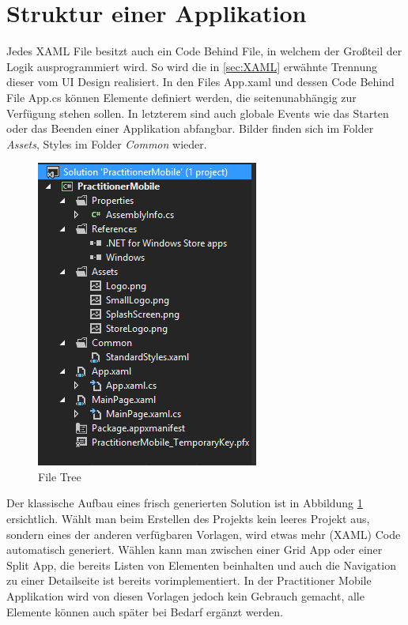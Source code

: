 \documentclass[a4paper,bibtotoc,oneside]{scrbook}
\begin{document}
\section{Struktur einer Applikation}
Jedes XAML File besitzt auch ein Code Behind File, in welchem der Großteil der Logik ausprogrammiert wird. So wird die in \ref{sec:XAML} erwähnte Trennung dieser vom UI Design realisiert.
\newline
\newline
In den Files App.xaml und dessen Code Behind File App.cs können Elemente definiert werden, die seitenunabhängig zur Verfügung stehen sollen. In letzterem sind auch globale Events wie das Starten oder das Beenden einer Applikation abfangbar.
\newline
\newline
Bilder finden sich im Folder \textit{Assets}, Styles im Folder \textit{Common} wieder.
\newline
\begin{figure}[htbp]
\centering
\includegraphics[scale=1]{images/filetree.png}
\caption[File Tree eines neu erzeugten Windows 8 / Windows RT Projekts]{File Tree}\label{Abb3}
\end{figure}
\newline
Der klassische Aufbau eines frisch generierten Solution ist in Abbildung \ref{Abb3} ersichtlich.
\newpage
Wählt man beim Erstellen des Projekts kein leeres Projekt aus, sondern eines der anderen verfügbaren Vorlagen, wird etwas mehr (XAML) Code automatisch generiert. Wählen kann man zwischen einer Grid App oder einer Split App, die bereits Listen von Elementen beinhalten und auch die Navigation zu einer Detailseite ist bereits vorimplementiert. In der Practitioner Mobile Applikation wird von diesen Vorlagen jedoch kein Gebrauch gemacht, alle Elemente können auch später bei Bedarf ergänzt werden.
\end{document}
